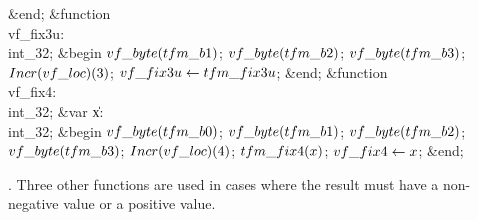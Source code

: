 \&{end};\7
\4\&{function}\1\  \\{vf\_fix3u}: \\{int\_32};\2\6
\&{begin} $\\{vf\_byte}(\\{tfm\_b1})$;\5
$\\{vf\_byte}(\\{tfm\_b2})$;\5
$\\{vf\_byte}(\\{tfm\_b3})$;\5
$\\{Incr}(\\{vf\_loc})(3)$;\6
$\\{vf\_fix3u}\K\\{tfm\_fix3u}$;\6
\&{end};\7
\4\&{function}\1\  \\{vf\_fix4}: \\{int\_32};\6
\4\&{var} \|x: \\{int\_32};\2\6
\&{begin} $\\{vf\_byte}(\\{tfm\_b0})$;\5
$\\{vf\_byte}(\\{tfm\_b1})$;\5
$\\{vf\_byte}(\\{tfm\_b2})$;\5
$\\{vf\_byte}(\\{tfm\_b3})$;\5
$\\{Incr}(\\{vf\_loc})(4)$;\6
$\\{tfm\_fix4}(\|x)$;\5
$\\{vf\_fix4}\K\|x$;\6
\&{end};\par
\fi

. Three other functions are used in cases where the result must have a
non-negative value or a positive value.

